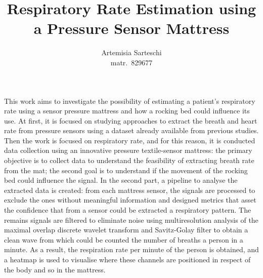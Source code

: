 \documentclass[a4paper,11pt, oneside,italian]{article}
\title{Respiratory Rate Estimation using a Pressure Sensor Mattress}
\author{Artemisia Sarteschi\\\smaller matr.~829677}
\date{}
\begin{document}
\maketitle
{}
\noindent


This work aims to investigate the possibility of estimating a patient's respiratory rate using a sensor pressure mattress and how a rocking bed could influence its use. 
At first, it is focused on studying approaches to extract the breath and heart rate from pressure sensors using a dataset already available from previous studies. Then the work is focused on respiratory rate, and for this reason, it is conducted data collection using an innovative pressure textile-sensor mattress: the primary objective is to collect data to understand the feasibility of extracting breath rate from the mat; the second goal is to understand if the movement of the rocking bed could influence the signal. 
In the second part, a pipeline to analyse the extracted data is created: from each mattress sensor, the signals are processed to exclude the ones without meaningful information and designed metrics that asset the confidence that from a sensor could be extracted a respiratory pattern. The remains signals are filtered to eliminate noise using multiresolution analysis of the maximal overlap discrete wavelet transform and Savitz-Golay filter to obtain a clean wave from which could be counted the number of breaths a person in a minute. As a result, the respiration rate per minute of the person is obtained, and a heatmap is used to visualise where these channels are positioned in respect of the body and so in the mattress.
\end{document}
